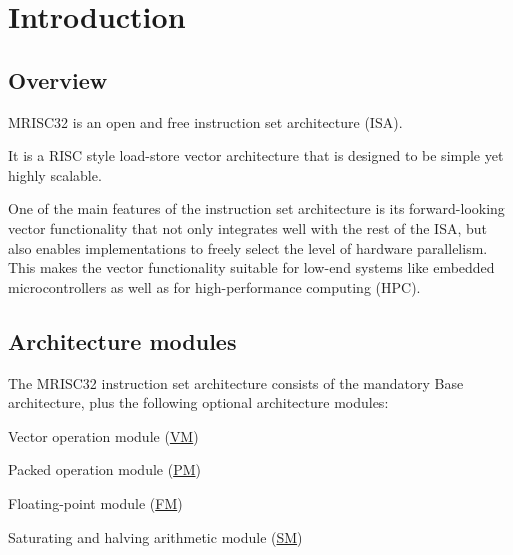 %

\chapter{Introduction}

\section{Overview}

MRISC32 is an open and free instruction set architecture (ISA).

It is a RISC style load-store vector architecture that is designed to be simple
yet highly scalable.

One of the main features of the instruction set architecture is its
forward-looking vector functionality that not only integrates well with the
rest of the ISA, but also enables implementations to freely select the level of
hardware parallelism. This makes the vector functionality suitable for low-end
systems like embedded microcontrollers as well as for high-performance
computing (HPC).


\section{Architecture modules}

The MRISC32 instruction set architecture consists of the mandatory Base
architecture, plus the following optional architecture modules:

\begin{bulletitems}
  \item Vector operation module (\hyperref[module:VM]{VM})
  \item Packed operation module (\hyperref[module:PM]{PM})
  \item Floating-point module (\hyperref[module:FM]{FM})
  \item Saturating and halving arithmetic module (\hyperref[module:SM]{SM})
\end{bulletitems}

